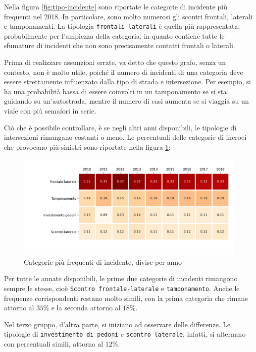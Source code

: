 \documentclass[a4paper,12pt]{report}
\newcommand{\columnstyle}[1]{\texttt{#1}}
\begin{document}
Nella figura \ref{fig:tipo-incidente} sono riportate le categorie di 
incidente più frequenti nel 2018.
In particolare, sono molto numerosi gli scontri frontali, laterali e tamponamenti. 
La tipologia \columnstyle{frontali-laterali} è quella più rappresentata, 
probabilmente per l'ampiezza della categoria, in quanto contiene 
tutte le sfumature di incidenti che non sono 
precisamente contatti frontali o laterali.

Prima di realizzare assunzioni errate, va detto che questo grafo, senza un contesto, 
non è molto utile, poiché il numero di incidenti di una categoria deve 
essere strettamente influenzato dalla tipo di strada e intersezione. 
Per esempio, si ha una probabilità bassa di essere coinvolti in un tamponamento 
se si sta guidando su un'autostrada, mentre il numero di casi aumenta se si viaggia 
su un viale con più semafori in serie.

Ciò che è possibile controllare, è se negli altri anni disponibili, le 
tipologie di intersezioni rimangano costanti o meno.
Le percentuali delle categorie di incroci che provocano più sinistri 
sono riportate nella figura \ref{fig:rapporto-tipologie}: 

\begin{figure}
    \includegraphics[width=\linewidth]{../src/incidenti/incidenti_senza_coords/localizzazione_incidente/rapporto_tipologie.png}
    \caption{Categorie più frequenti di incidente, divise per anno}
    \label{fig:rapporto-tipologie}
\end{figure}

Per tutte le annate disponibili, le prime due categorie di incidenti rimangono sempre 
le stesse, cioè \columnstyle{Scontro frontale-laterale} e \columnstyle{tamponamento}. 
Anche le frequenze corrispondenti restano molto simili, con la prima 
categoria che rimane attorno al $35\%$ e la seconda attorno al $18\%$.

Nel terzo gruppo, d'altra parte, si iniziano ad osservare delle differenze. 
Le tipologie di \columnstyle{investimento di pedoni} e \columnstyle{scontro laterale}, 
infatti, si alternano con percentuali simili, attorno al $12\%$.
\end{document}
